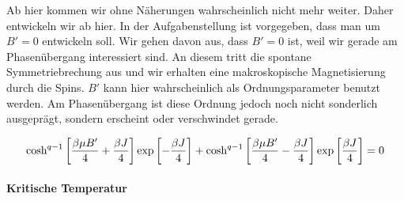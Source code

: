 Ab hier kommen wir ohne Näherungen wahrscheinlich nicht mehr weiter. Daher
entwickeln wir ab hier. In der Aufgabenstellung ist vorgegeben, dass man um $B'
= 0$ entwickeln soll. Wir gehen davon aus, dass $B' = 0$ ist, weil wir gerade
am Phasenübergang interessiert sind. An diesem tritt die spontane
Symmetriebrechung aus und wir erhalten eine makroskopische Magnetisierung durch
die Spins. $B'$ kann hier wahrscheinlich als Ordnungsparameter benutzt werden.
Am Phasenübergang ist diese Ordnung jedoch noch nicht sonderlich ausgeprägt,
sondern erscheint oder verschwindet gerade.

\begin{align*}
    \cosh^{q-1}\sbr{\frac{\beta \mu B'}4 + \frac{\beta J}4}
    \exp\sbr{- \frac{\beta J}4}
    + \cosh^{q-1}\sbr{\frac{\beta \mu B'}4 - \frac{\beta J}4}
    \exp\sbr{\frac{\beta J}4} &= 0 \\
\end{align*}

\fehlt

\paragraph{Kritische Temperatur}

\fehlt

\IfFileExists{\bibliographyfile}{
    \printbibliography
}{}



